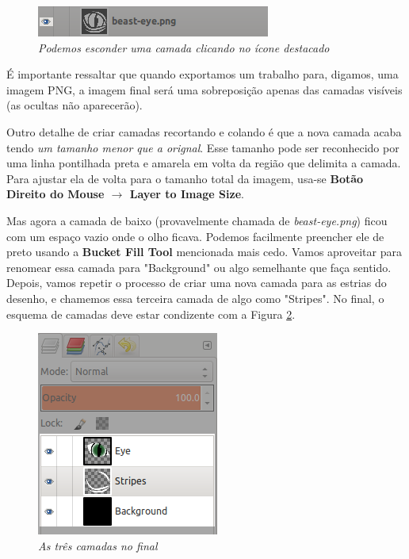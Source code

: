 \documentclass[12pt,onecolumn]{article}
\begin{document}
    \begin{figure}[H]
      \centering
      \includegraphics[width=.5\textwidth]{screenshots/06-hide_layer.png}
      \caption{
        \footnotesize
        \it Podemos esconder uma camada clicando no ícone destacado
      }
      \label{fig:hide_layer}
    \end{figure}
    
    \begin{framed}
      É importante ressaltar que quando exportamos um trabalho para, digamos,
      uma imagem PNG, a imagem final será uma sobreposição apenas das camadas
      visíveis (as ocultas não aparecerão).
    \end{framed}
    
    Outro detalhe de criar camadas recortando e colando é que a nova camada
    acaba tendo {\it um tamanho menor que a orignal}. Esse tamanho pode ser
    reconhecido por uma linha pontilhada preta e amarela em volta da região que
    delimita a camada. Para ajustar ela de volta para o tamanho total da imagem,
    usa-se {\bf Botão Direito do Mouse $\rightarrow$ Layer to Image Size}.
    
    
    Mas agora a camada de baixo (provavelmente chamada de {\it beast-eye.png})
    ficou com um espaço vazio onde o olho ficava. Podemos facilmente preencher
    ele de preto usando a {\bf Bucket Fill Tool} mencionada mais cedo. Vamos
    aproveitar para renomear essa camada para "Background" ou algo semelhante
    que faça sentido. Depois, vamos repetir o processo de criar uma nova camada
    para as estrias do desenho, e chamemos essa terceira camada de algo como
    "Stripes". No final, o esquema de camadas deve estar condizente com a Figura
    \ref{fig:layers}.
    
    \begin{figure}[ht]
      \centering
      \includegraphics[width=.5\textwidth]{screenshots/07-layers.png}
      \caption{
        \footnotesize
        \it
        As três camadas no final
      }
      \label{fig:layers}
    \end{figure}
    
\end{document}
